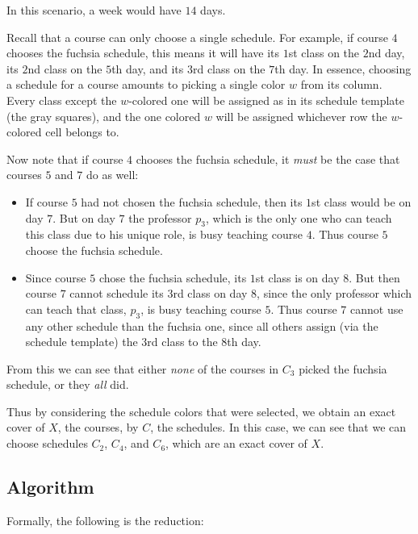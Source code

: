 In this scenario, a week would have $14$ days.

Recall that a course can only choose a single schedule. For example, if course $4$ chooses the {\color{Fuchsia}fuchsia} schedule, this means it will have its $1$st class on the $2$nd day, its $2$nd class on the $5$th day, and its $3$rd class on the $7$th day. In essence, choosing a schedule for a course amounts to picking a single color $w$ from its column. Every class except the $w$-colored one will be assigned as in its schedule template (the {\color{gray}gray} squares), and the one colored $w$ will be assigned whichever row the $w$-colored cell belongs to.


Now note that if course $4$ chooses the {\color{Fuchsia}fuchsia} schedule, it \emph{must} be the case that courses $5$ and $7$ do as well:
\begin{itemize}
\item If course $5$ had not chosen the {\color{Fuchsia}fuchsia} schedule, then its $1$st class would be on day $7$. But on day $7$ the professor $p_3$, which is the only one who can teach this class due to his unique role, is busy teaching course $4$. Thus course $5$ choose the {\color{Fuchsia}fuchsia} schedule.
\item Since course $5$ chose the {\color{Fuchsia}fuchsia} schedule, its $1$st class is on day $8$. But then course $7$ cannot schedule its $3$rd class on day $8$, since the only professor which can teach that class, $p_3$, is busy teaching course $5$. Thus course $7$ cannot use any other schedule than the {\color{Fuchsia}fuchsia} one, since all others assign (via the schedule template) the $3$rd class to the $8$th day.
\end{itemize}

From this we can see that either \emph{none} of the courses in {\color{Fuchsia}$C_3$} picked the {\color{Fuchsia}fuchsia} schedule, or they \emph{all} did.

Thus by considering the schedule colors that were selected, we obtain an exact cover of $X$, the courses, by $C$, the schedules. In this case, we can see that we can choose schedules {\color{NavyBlue} $C_2$}, {\color{ForestGreen} $C_4$}, and {\color{Tan} $C_6$}, which are an exact cover of $X$.






\newpage
\subsection{Algorithm}
Formally, the following is the reduction:

